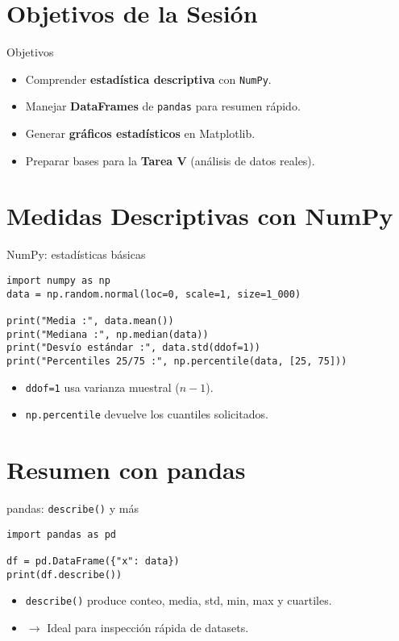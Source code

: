 \documentclass[10pt]{beamer}
\begin{document}
\section{Objetivos de la Sesión}
\begin{frame}{Objetivos}
  \begin{itemize}
    \item Comprender \textbf{estadística descriptiva} con \texttt{NumPy}.
    \item Manejar \textbf{DataFrames} de \texttt{pandas} para resumen rápido.
    \item Generar \textbf{gráficos estadísticos} en Matplotlib.
    \item Preparar bases para la \textbf{Tarea V} (análisis de datos reales).
  \end{itemize}
\end{frame}

\section{Medidas Descriptivas con NumPy}
\begin{frame}[fragile]{NumPy: estadísticas básicas}
\begin{verbatim}
import numpy as np
data = np.random.normal(loc=0, scale=1, size=1_000)

print("Media :", data.mean())
print("Mediana :", np.median(data))
print("Desvío estándar :", data.std(ddof=1))
print("Percentiles 25/75 :", np.percentile(data, [25, 75]))
\end{verbatim}
\begin{itemize}
  \item \texttt{ddof=1} usa varianza muestral (\(n-1\)).
  \item \texttt{np.percentile} devuelve los cuantiles solicitados.
\end{itemize}
\end{frame}

\section{Resumen con pandas}
\begin{frame}[fragile]{pandas: \texttt{describe()} y más}
\begin{verbatim}
import pandas as pd

df = pd.DataFrame({"x": data})
print(df.describe())
\end{verbatim}
\begin{itemize}
  \item \texttt{describe()} produce conteo, media, std, min, max y cuartiles.
  \item \(\rightarrow\) Ideal para inspección rápida de datasets.
\end{itemize}
\end{frame}
\end{document}
